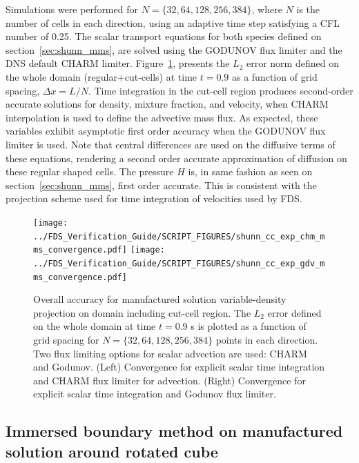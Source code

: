 \documentclass[11pt]{book}
\begin{document}
Simulations were performed for $N = \{32, 64, 128, 256, 384\}$, where $N$ is the number of cells in each direction, using an adaptive time step satisfying a CFL number of 0.25. The scalar transport equations for both species defined on section~\ref{sec:shunn_mms}, are solved using the GODUNOV flux limiter and the DNS default CHARM limiter. Figure~\ref{fig:shunn_cc_accuracy_order}, presents the $L_2$ error norm defined on the whole domain (regular+cut-cells) at time $t = 0.9$ as a function of grid spacing, $\Delta x = L/N$. Time integration in the cut-cell region produces second-order accurate solutions for density, mixture fraction, and velocity, when CHARM interpolation is used to define the advective mass flux. As expected, these variables exhibit asymptotic first order accuracy when the GODUNOV flux limiter is used. Note that central differences are used on the diffusive terms of these equations, rendering a second order accurate approximation of diffusion on these regular shaped cells. The pressure $H$ is, in same fashion as seen on section~\ref{sec:shunn_mms}, first order accurate. This is consistent with the projection scheme used for time integration of velocities used by FDS.


\begin{figure}[ht]
\centering
\texttt{[image: ../FDS\_Verification\_Guide/SCRIPT\_FIGURES/shunn\_cc\_exp\_chm\_mms\_convergence.pdf]}
\texttt{[image: ../FDS\_Verification\_Guide/SCRIPT\_FIGURES/shunn\_cc\_exp\_gdv\_mms\_convergence.pdf]}
\caption[The {\ct Shunn CC} accuracy order test case]{Overall accuracy for manufactured solution variable-density projection on domain including cut-cell region. The $L_2$ error defined on the whole domain at time $t = 0.9$ s is plotted as a function of grid spacing for $N=\{32,64,128,256,384\}$ points in each direction. Two flux limiting options for scalar advection are used: CHARM and Godunov.  (Left) Convergence for explicit scalar time integration and CHARM flux limiter for advection.  (Right) Convergence for explicit scalar time integration and Godunov flux limiter. }\label{fig:shunn_cc_accuracy_order}
\end{figure}


\subsection{Immersed boundary method on manufactured solution around rotated cube}

\label{sec:rotcube_cc_mms}
\end{document}
